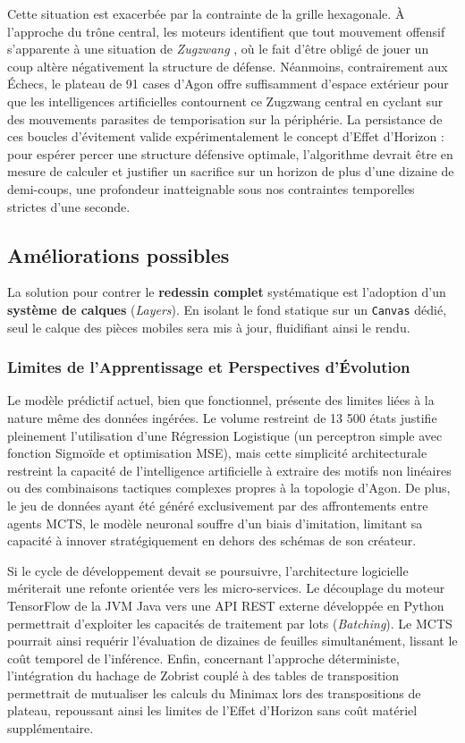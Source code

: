 \documentclass[a4paper]{article}
\begin{document}
Cette situation est exacerbée par la contrainte de la grille hexagonale. À l'approche du trône central, les moteurs identifient que tout mouvement offensif s'apparente à une situation de \textit{Zugzwang} \cite{elkies1996zugzwang}, où le fait d'être obligé de jouer un coup altère négativement la structure de défense. Néanmoins, contrairement aux Échecs, le plateau de 91 cases d'Agon offre suffisamment d'espace extérieur pour que les intelligences artificielles contournent ce Zugzwang central en cyclant sur des mouvements parasites de temporisation sur la périphérie. La persistance de ces boucles d'évitement valide expérimentalement le concept d'Effet d'Horizon \cite{berliner1973horizon} : pour espérer percer une structure défensive optimale, l'algorithme devrait être en mesure de calculer et justifier un sacrifice sur un horizon de plus d'une dizaine de demi-coups, une profondeur inatteignable sous nos contraintes temporelles strictes d'une seconde.
\subsection{Améliorations possibles}
La solution pour contrer le \textbf{redessin complet} systématique est l'adoption d'un \textbf{système de calques} (\textit{Layers}). En isolant le fond statique sur un \texttt{Canvas} dédié, seul le calque des pièces mobiles sera mis à jour, fluidifiant ainsi le rendu.

\subsubsection{Limites de l'Apprentissage et Perspectives d'Évolution}

Le modèle prédictif actuel, bien que fonctionnel, présente des limites liées à la nature même des données ingérées. Le volume restreint de 13 500 états justifie pleinement l'utilisation d'une Régression Logistique (un perceptron simple avec fonction Sigmoïde et optimisation MSE), mais cette simplicité architecturale restreint la capacité de l'intelligence artificielle à extraire des motifs non linéaires ou des combinaisons tactiques complexes propres à la topologie d'Agon. De plus, le jeu de données ayant été généré exclusivement par des affrontements entre agents MCTS, le modèle neuronal souffre d'un biais d'imitation, limitant sa capacité à innover stratégiquement en dehors des schémas de son créateur.

Si le cycle de développement devait se poursuivre, l'architecture logicielle mériterait une refonte orientée vers les micro-services. Le découplage du moteur TensorFlow de la JVM Java vers une API REST externe développée en Python permettrait d'exploiter les capacités de traitement par lots (\textit{Batching}). Le MCTS pourrait ainsi requérir l'évaluation de dizaines de feuilles simultanément, lissant le coût temporel de l'inférence. Enfin, concernant l'approche déterministe, l'intégration du hachage de Zobrist couplé à des tables de transposition permettrait de mutualiser les calculs du Minimax lors des transpositions de plateau, repoussant ainsi les limites de l'Effet d'Horizon sans coût matériel supplémentaire.
\end{document}
